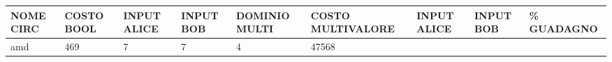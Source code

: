 \documentclass[italian,]{book}
\begin{document}
\begin{longtable}[]{@{}lllllllll@{}}
\toprule
\begin{minipage}[b]{0.07\columnwidth}\raggedright
NOME CIRC\strut
\end{minipage} & \begin{minipage}[b]{0.11\columnwidth}\raggedright
COSTO BOOL\strut
\end{minipage} & \begin{minipage}[b]{0.08\columnwidth}\raggedright
INPUT ALICE\strut
\end{minipage} & \begin{minipage}[b]{0.07\columnwidth}\raggedright
INPUT BOB\strut
\end{minipage} & \begin{minipage}[b]{0.09\columnwidth}\raggedright
DOMINIO MULTI\strut
\end{minipage} & \begin{minipage}[b]{0.12\columnwidth}\raggedright
COSTO MULTIVALORE\strut
\end{minipage} & \begin{minipage}[b]{0.08\columnwidth}\raggedright
INPUT ALICE\strut
\end{minipage} & \begin{minipage}[b]{0.07\columnwidth}\raggedright
INPUT BOB\strut
\end{minipage} & \begin{minipage}[b]{0.07\columnwidth}\raggedright
\% GUADAGNO\strut
\end{minipage}\tabularnewline
\midrule
\endhead
\begin{minipage}[t]{0.07\columnwidth}\raggedright
amd\strut
\end{minipage} & \begin{minipage}[t]{0.11\columnwidth}\raggedright
469\strut
\end{minipage} & \begin{minipage}[t]{0.08\columnwidth}\raggedright
7\strut
\end{minipage} & \begin{minipage}[t]{0.07\columnwidth}\raggedright
7\strut
\end{minipage} & \begin{minipage}[t]{0.09\columnwidth}\raggedright
4\strut
\end{minipage} & \begin{minipage}[t]{0.12\columnwidth}\raggedright
47568\strut
\end{minipage} & \begin{minipage}[t]{0.08\columnwidth}\raggedright

\end{minipage}
\end{longtable}
\end{document}
